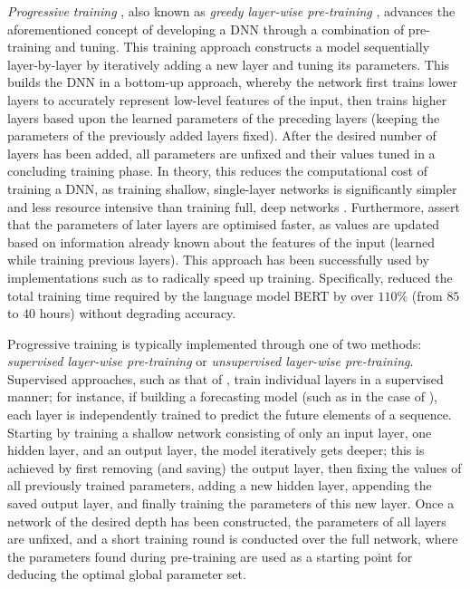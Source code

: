 \documentclass[a4paper, 11pt]{report}
\begin{document}
    \emph{Progressive training} \citep{xu-2021}, also known as \emph{greedy layer-wise pre-training} \citep{xu-2018}, advances the aforementioned concept of developing a DNN through a combination of pre-training and tuning. This training approach constructs a model sequentially layer-by-layer by iteratively adding a new layer and tuning its parameters. This builds the DNN in a bottom-up approach, whereby the network first trains lower layers to accurately represent low-level features of the input, then trains higher layers based upon the learned parameters of the preceding layers (keeping the parameters of the previously added layers fixed). After the desired number of layers has been added, all parameters are unfixed and their values tuned in a concluding training phase. In theory, this reduces the computational cost of training a DNN, as training shallow, single-layer networks is significantly simpler and less resource intensive than training full, deep networks \citep{xu-2021}. Furthermore, \citet{xu-2021} assert that the parameters of later layers are optimised faster, as values are updated based on information already known about the features of the input (learned while training previous layers). This approach has been successfully used by implementations such as \citet{yang-2020} to radically speed up training. Specifically, \citet{yang-2020} reduced the total training time required by the language model BERT by over $110\%$ (from $85$ to $40$ hours) without degrading accuracy.

    Progressive training is typically implemented through one of two methods: \emph{supervised layer-wise pre-training} or \emph{unsupervised layer-wise pre-training}. Supervised approaches, such as that of \citet{ienco-2019}, train individual layers in a supervised manner; for instance, if building a forecasting model (such as in the case of \citet{xu-2018}), each layer is independently trained to predict the future elements of a sequence. Starting by training a shallow network consisting of only an input layer, one hidden layer, and an output layer, the model iteratively gets deeper; this is achieved by first removing (and saving) the output layer, then fixing the values of all previously trained parameters, adding a new hidden layer, appending the saved output layer, and finally training the parameters of this new layer. Once a network of the desired depth has been constructed, the parameters of all layers are unfixed, and a short training round is conducted over the full network, where the parameters found during pre-training are used as a starting point for deducing the optimal global parameter set. 
\end{document}

